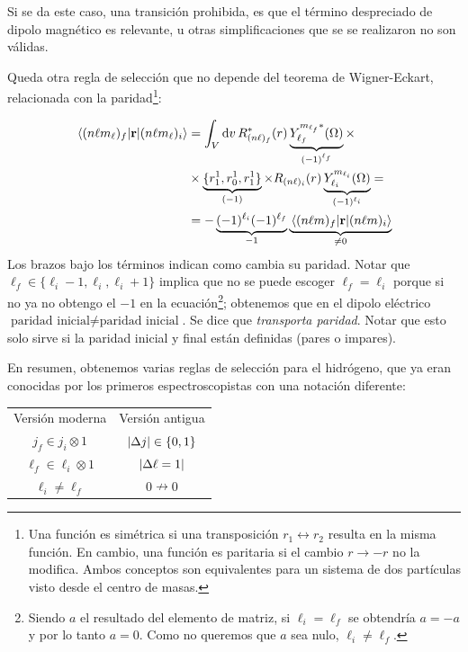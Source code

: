 Si se da este caso, una transición prohibida, es que el término
despreciado de dipolo magnético
es relevante, u otras simplificaciones que se se realizaron no son
válidas.



Queda otra regla de selección que no depende del teorema de
Wigner-Eckart, relacionada con la paridad\footnote{Una función es
  simétrica si una transposición $r_1\leftrightarrow r_2$ resulta en
  la misma función. En cambio, una función es paritaria si el cambio
  $r\rightarrow-r$ no la modifica. Ambos conceptos son equivalentes
  para un sistema de dos partículas visto desde el centro de masas.}:

\begin{equation}
  \begin{split}
    \mel{(n{\ell}m_{\ell})_f}{\bm{\mathrm{r}}}{(n{\ell}m_{\ell})_i} &= \int_V \dd{v}
    R^*_{(n{\ell})_f} (r) \underbrace{Y_{{\ell}_f}^{m_{\ell_f}*}
      (\Omega)}_{(-1)^{{\ell}_f}} \times\\ &\times
    \underbrace{\{r_1^1,r_0^1,r_1^1\}}_{(-1)} \times
    R_{(n{\ell})_i}(r)
    \underbrace{Y_{{\ell}_i}^{m_{\ell_i}}(\Omega)}_{(-1)^{{\ell}_i}} =
    \\
    &= -  \underbrace{(-1)^{{\ell}_i} (-1)^{{\ell}_f}}_{-1}
    \underbrace{\mel{(n{\ell}m)_f}{\bm{\mathrm{r}}}{(n{\ell}m)_i}}_{\neq 0}
  \end{split}
\end{equation}
Los brazos bajo los términos indican como cambia su paridad. Notar que $\ell_f
\in \{\ell_i-1,\ell_i,\ell_i+1\}$ implica que no se puede escoger $\ell_f=\ell_i$ porque si no
ya no obtengo el $-1$ en la ecuación\footnote{Siendo $a$ el resultado
  del elemento de matriz, si $\ell_i=\ell_f$ se obtendría $a=-a$ y por
lo tanto $a=0$. Como no queremos que $a$ sea nulo, $\ell_i\neq\ell_f$.};
obtenemos que en el dipolo eléctrico $\text{paridad inicial} \neq \text{paridad
inicial} $. Se dice que \emph{transporta paridad}. Notar que esto solo sirve si
la paridad inicial y final están definidas (pares o impares).

En resumen, obtenemos varias reglas de selección para el hidrógeno,
que ya eran conocidas por los primeros espectroscopistas con una notación diferente:
\begin{center}
  \begin{tabular}{cc}
    Versión moderna & Versión antigua \\
    $j_f \in j_i \otimes 1 $ & $\abs{\Delta j} \in \{0,1\}$ \\
    $ \ell_f \in \ell_i \otimes 1$& $\abs{\Delta \ell = 1}$ \\
    $ \ell_i \neq \ell_f$ & $0 \nrightarrow 0 $
  \end{tabular}
\end{center}

